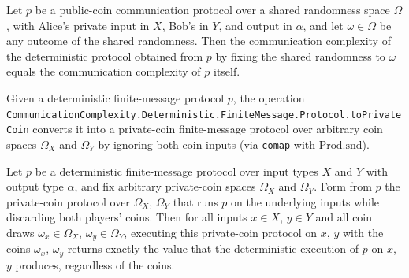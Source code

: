 \begin{theorem}
\label{CommunicationComplexity.PublicCoin.Protocol.toDeterministic_complexity}
\leanok
{}
Let $p$ be a public-coin communication protocol over a shared randomness space $\Omega$,
with Alice's private input in $X$, Bob's in $Y$, and output in $\alpha$, and let $\omega
\in \Omega$ be any outcome of the shared randomness. Then the communication complexity
of the deterministic protocol obtained from $p$ by fixing the shared randomness to
$\omega$ equals the communication complexity of $p$ itself.
\end{theorem}

\begin{definition}
\label{CommunicationComplexity.Deterministic.FiniteMessage.Protocol.toPrivateCoin}
\leanok
{}
Given a deterministic finite-message protocol $p$, the operation
\texttt{CommunicationComplexity.Deterministic.FiniteMessage.Protocol.toPrivateCoin} converts it into a
private-coin finite-message protocol over arbitrary coin spaces $\Omega_X$ and
$\Omega_Y$ by ignoring both coin inputs (via \texttt{comap} with $\mathrm{Prod.snd}$).
\end{definition}

\begin{theorem}
\label{CommunicationComplexity.Deterministic.FiniteMessage.Protocol.toPrivateCoin_rrun}
\leanok
{}
Let $p$ be a deterministic finite-message protocol over input types $X$ and $Y$ with
output type $\alpha$, and fix arbitrary private-coin spaces $\Omega_X$ and $\Omega_Y$.
Form from $p$ the private-coin protocol over $\Omega_X$, $\Omega_Y$ that runs $p$ on the
underlying inputs while discarding both players' coins. Then for all inputs $x \in X$,
$y \in Y$ and all coin draws $\omega_x \in \Omega_X$, $\omega_y \in \Omega_Y$, executing
this private-coin protocol on $x$, $y$ with the coins $\omega_x$, $\omega_y$ returns
exactly the value that the deterministic execution of $p$ on $x$, $y$ produces,
regardless of the coins.
\end{theorem}

